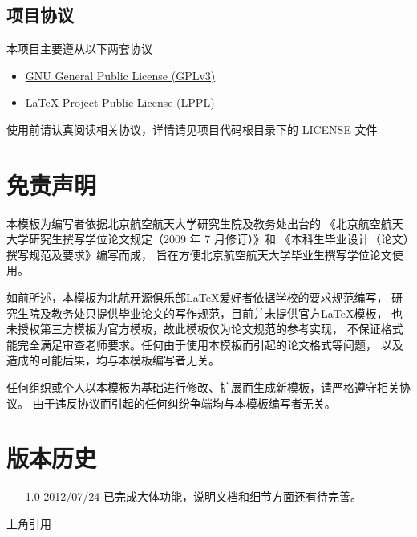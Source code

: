\documentclass[master,openright,twoside,color,AutoFakeBold=true]{misc/buaathesis}
\begin{document}
\subsection{项目协议}
本项目主要遵从以下两套协议
\begin{itemize}
    \item \href{http://www.gnu.org/licenses/gpl.txt}
        {GNU General Public License (GPLv3)}
    \item \href{http://www.latex-project.org/lppl.txt}
        {\LaTeX{} Project Public License (LPPL)}
\end{itemize}
使用前请认真阅读相关协议，详情请见项目代码根目录下的 LICENSE 文件

\section{免责声明}
本模板为编写者依据北京航空航天大学研究生院及教务处出台的
《北京航空航天大学研究生撰写学位论文规定（2009 年 7 月修订）》和
《本科生毕业设计（论文）撰写规范及要求》编写而成，
旨在方便北京航空航天大学毕业生撰写学位论文使用。

如前所述，本模板为北航开源俱乐部\LaTeX{}爱好者依据学校的要求规范编写，
研究生院及教务处只提供毕业论文的写作规范，目前并未提供官方\LaTeX{}模板，
也未授权第三方模板为官方模板，故此模板仅为论文规范的参考实现，
不保证格式能完全满足审查老师要求。任何由于使用本模板而引起的论文格式等问题，
以及造成的可能后果，均与本模板编写者无关。

任何组织或个人以本模板为基础进行修改、扩展而生成新模板，请严格遵守相关协议。
由于违反协议而引起的任何纠纷争端均与本模板编写者无关。

\section{版本历史}
\begin{itemize}
    \item[1.0] 2012/07/24 已完成大体功能，说明文档和细节方面还有待完善。
\end{itemize}
上角引用
\ifdefined\maindoc
\else
  
  
\end{document}
